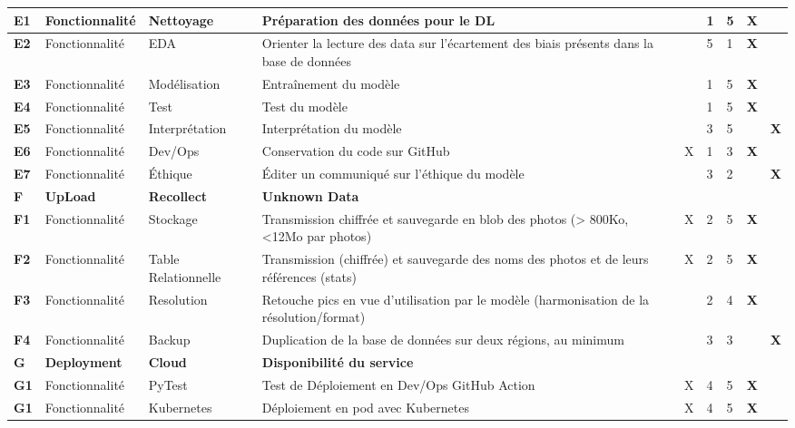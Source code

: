 \documentclass[12pt]{article}
\begin{document}
\begin{landscape}
\begin{table}[H]
{\begin{tabular}{p{1cm}p{2cm}p{3cm}p{10cm}p{1.75cm}p{1.5cm}p{1.25cm}p{.5cm}p{.5cm}}
\hline  	\bf E1& Fonctionnalité & Nettoyage & Préparation des données pour le DL&  & 1 &  5 & \bf X &  \\
\hline  	\bf E2& Fonctionnalité & EDA & Orienter la lecture des data sur l’écartement des biais présents dans la base de données &  & 5 &  1 & \bf X &  \\
\hline  	\bf E3& Fonctionnalité & Modélisation & Entraînement du modèle &  & 1 &  5 & \bf X &  \\
\hline  	\bf E4& Fonctionnalité & Test & Test du modèle &  & 1 &  5 & \bf X &  \\
\hline  	\bf E5& Fonctionnalité & Interprétation & Interprétation du modèle &  & 3 &  5 &  & \bf X \\
\hline  	\bf E6& Fonctionnalité & Dev/Ops & Conservation du code sur GitHub & X & 1 &  3 & \bf X & \\
\hline  	\bf E7& Fonctionnalité & Éthique & Éditer un communiqué sur l’éthique du modèle &  & 3 &  2 &  & \bf X \\
\hline  	\bf F\cellcolor{gray!50}& \bf UpLoad\cellcolor{gray!50}& \bf Recollect \cellcolor{gray!50}& \bf Unknown Data\cellcolor{gray!50}& \cellcolor{gray!50} & \cellcolor{gray!50} &  \cellcolor{gray!50} & \cellcolor{gray!50} &  \cellcolor{gray!50}\\
\hline  	\bf F1& Fonctionnalité & Stockage & Transmission chiffrée et sauvegarde en blob des photos (> 800Ko, <12Mo par photos) & X & 2 & 5 & \bf X &  \\
\hline  	\bf F2& Fonctionnalité & Table Relationnelle & Transmission (chiffrée) et sauvegarde des noms des photos et de leurs références (stats) & X & 2 & 5 & \bf X &  \\
\hline  	\bf F3& Fonctionnalité & Resolution & Retouche pics en vue d’utilisation par le modèle (harmonisation de la résolution/format) &  & 2 & 4 & \bf X &  \\
\hline  	\bf F4& Fonctionnalité & Backup & Duplication de la base de données sur deux régions, au minimum &  & 3 & 3 &  & \bf X \\
\hline  	\bf G\cellcolor{gray!50}& \bf Deployment\cellcolor{gray!50}& \bf Cloud \cellcolor{gray!50}& \bf Disponibilité du service\cellcolor{gray!50}& \cellcolor{gray!50} & \cellcolor{gray!50} &  \cellcolor{gray!50} & \cellcolor{gray!50} &  \cellcolor{gray!50}\\
\hline  	\bf G1& Fonctionnalité & PyTest & Test de Déploiement en Dev/Ops GitHub Action & X & 4 & 5 & \bf X &  \\
\hline  	\bf G1& Fonctionnalité & Kubernetes & Déploiement en pod avec Kubernetes & X & 4 & 5 & \bf X &  \\

\end{tabular}}
\end{table}
\end{landscape}
\end{document}
